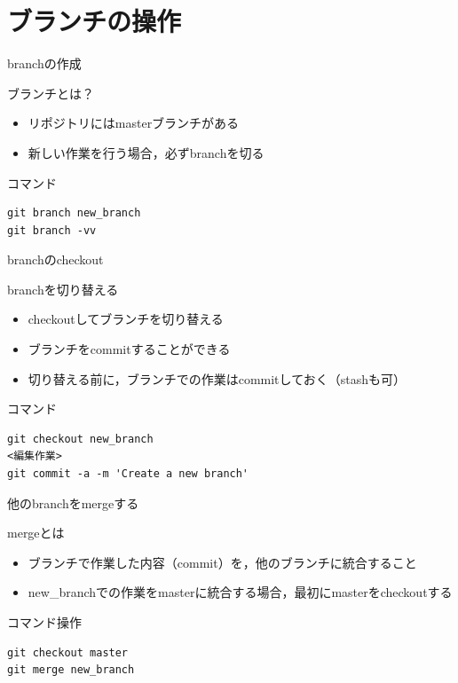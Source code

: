 \documentclass[t, aspectratio=169]{beamer}
\begin{document}
\section{ブランチの操作}
\label{sec-3-2}
\begin{frame}[fragile,label=sec-3-2-1]{branchの作成}
 \begin{block}{ブランチとは？}
\begin{itemize}
\item リポジトリにはmasterブランチがある
\item 新しい作業を行う場合，必ずbranchを切る
\end{itemize}
\end{block}
\begin{block}{コマンド}
\begin{verbatim}
git branch new_branch
git branch -vv
\end{verbatim}
\end{block}
\end{frame}

\begin{frame}[fragile,label=sec-3-2-2]{branchのcheckout}
 \begin{block}{branchを切り替える}
\begin{itemize}
\item checkoutしてブランチを切り替える
\item ブランチをcommitすることができる
\item 切り替える前に，ブランチでの作業はcommitしておく（stashも可）
\end{itemize}
\end{block}
\begin{block}{コマンド}
\begin{verbatim}
git checkout new_branch
<編集作業>
git commit -a -m 'Create a new branch'
\end{verbatim}
\end{block}
\end{frame}

\begin{frame}[fragile,label=sec-3-2-3]{他のbranchをmergeする}
 \begin{block}{mergeとは}
\begin{itemize}
\item ブランチで作業した内容（commit）を，他のブランチに統合すること
\item new\_branchでの作業をmasterに統合する場合，最初にmasterをcheckoutする
\end{itemize}
\end{block}
\begin{block}{コマンド操作}
\begin{verbatim}
git checkout master
git merge new_branch
\end{verbatim}
\end{block}
\end{frame}
\end{document}
